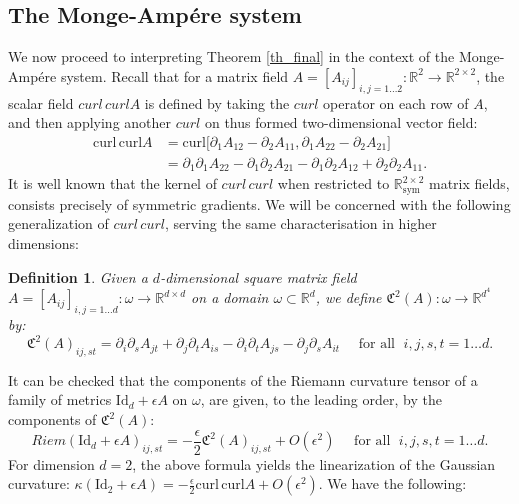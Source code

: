 \documentclass[reqno,twoside,11pt]{amsart}
\newcommand{\sym}{\mathrm{sym}}
\newcommand{\curl}{\mathrm{curl}}
\newcommand{\Id}{\mathrm{Id}}
\newcommand{\R}{\mathbb{R}}
\numberwithin{equation}{section}
\theoremstyle{plain}
\newtheorem{definition}[theorem]{Definition}
\theoremstyle{definition}
\begin{document}
\subsection{The Monge-Amp\'ere system}

We now proceed to interpreting Theorem \ref{th_final} in the context of the
Monge-Amp\'ere system. 
Recall that for a matrix field $A=[A_{ij}]_{i,j=1\ldots 2}:\R^2\to\R^{2\times 2}$, the scalar
field ${curl}\, curl A$ is defined by taking 
the $curl$ operator on each row of $A$, and then applying another $curl$ on thus
formed two-dimensional vector field:
\begin{equation*}
\begin{split}
\curl\,\curl A & = \curl\big[\partial_1 A_{12}-\partial_2A_{11}, \partial_1
A_{22}-\partial_2A_{21}\big] \\ & = \partial_1 \partial_1A_{22}-\partial_1\partial_2A_{21}
- \partial_1\partial_2 A_{12} +\partial_2\partial_2A_{11}.
\end{split}
\end{equation*}
It is well known that the kernel of ${curl}\,
curl $ when restricted to $\R^{2\times 2}_{\sym}$ matrix fields, consists precisely
of symmetric gradients. We will be concerned with the following generalization of ${curl}\,
curl$, serving the same characterisation in higher dimensions:

\begin{definition}\label{defC2}
Given a $d$-dimensional square matrix field $A = [A_{ij}]_{i,j=1\ldots
  d}:\omega\to \R^{d\times d}$ on a domain $\omega\subset\R^d$, we
define $\mathfrak{C}^2(A):\omega\to \R^{d^4}$ by:
\begin{equation}\label{C2}
\mathfrak{C}^2(A)_{ij,st} = \partial_i\partial_s A_{jt}
+ \partial_j\partial_tA_{is} - \partial_{i}\partial_tA_{js}
- \partial_j\partial_sA_{it}\quad\mbox{ for all }\; i,j,s,t=1\ldots d.
\end{equation}
\end{definition}

\smallskip

\noindent It can be checked that the components of the Riemann curvature tensor
of a family of metrics $\Id_d+\epsilon A$ on $\omega$, are given, to the leading
order, by the components of $\mathfrak{C}^2(A)$:
\begin{equation}\label{RiemC2}
Riem(\Id_d + \epsilon A)_{ij,st} =
-\frac{\epsilon}{2}\mathfrak{C}^2(A)_{ij,st} + O(\epsilon^2) \quad\mbox{ for all }\; i,j,s,t=1\ldots d.
\end{equation}
For dimension $d=2$, the above formula yields the linearization of the
Gaussian curvature: $\kappa(\Id_2 + \epsilon A) =
-\frac{\epsilon}{2}\curl\,\curl A +O(\epsilon^2)$.
We have the following:
\end{document}
